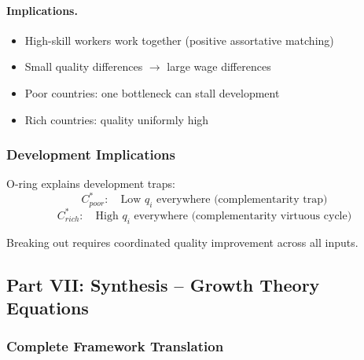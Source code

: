 \paragraph{Implications.}
\begin{itemize}
    \item High-skill workers work together (positive assortative matching)
    \item Small quality differences $\to$ large wage differences
    \item Poor countries: one bottleneck can stall development
    \item Rich countries: quality uniformly high
\end{itemize}

\subsubsection{Development Implications}

O-ring explains development traps:
\begin{equation}
C^*_{poor}: \quad \text{Low } q_i \text{ everywhere (complementarity trap)}
\end{equation}
\begin{equation}
C^*_{rich}: \quad \text{High } q_i \text{ everywhere (complementarity virtuous cycle)}
\end{equation}

Breaking out requires coordinated quality improvement across all inputs.

\subsection{Part VII: Synthesis – Growth Theory Equations}

\subsubsection{Complete Framework Translation}

